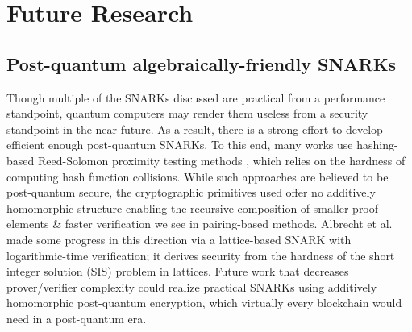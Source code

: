 \section{Future Research}

\subsection{Post-quantum algebraically-friendly SNARKs}
\noindent Though multiple of the SNARKs discussed are practical from a performance standpoint, quantum computers may render them useless from a security standpoint in the near future. As a result, there is a strong effort to develop efficient enough post-quantum SNARKs. To this end, many works \cite{starks, ligero, fractal, spartan, jolt} use hashing-based Reed-Solomon proximity testing methods \cite{fri}, which relies on the hardness of computing hash function collisions. While such approaches are believed to be post-quantum secure, the cryptographic primitives used offer no additively homomorphic structure enabling the recursive composition of smaller proof elements \& faster verification we see in pairing-based methods. Albrecht et al. \cite{lattice1} made some progress in this direction via a lattice-based SNARK with logarithmic-time verification; it derives security from the hardness of the short integer solution (SIS) problem in lattices. Future work that decreases prover/verifier complexity could realize practical SNARKs using additively homomorphic post-quantum encryption, which virtually every blockchain would need in a post-quantum era.

